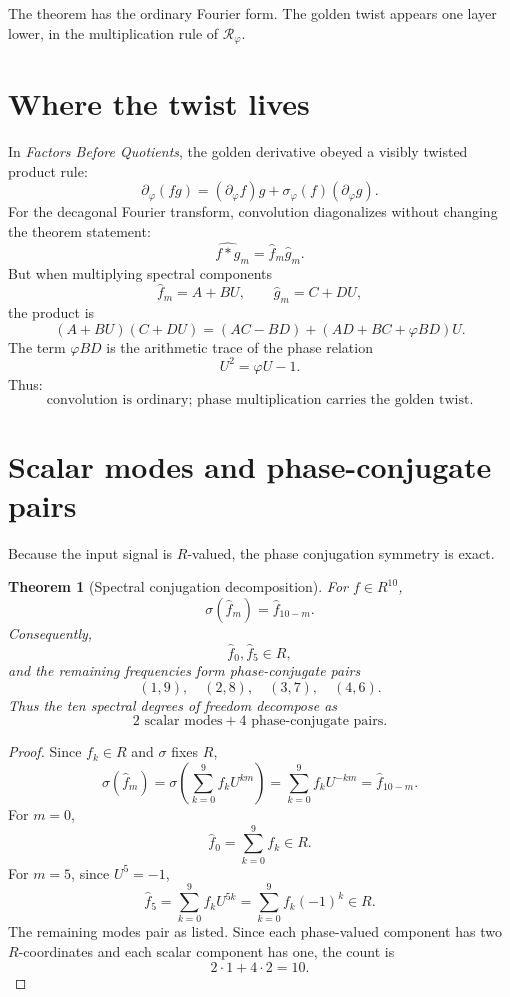 \documentclass[11pt]{article}
\newtheorem{theorem}[definition]{Theorem}
\newcommand{\ph}{\varphi}
\newcommand{\RR}{\mathcal R_\ph}
\newcommand{\sig}{\sigma}
\begin{document}
The theorem has the ordinary Fourier form.  The golden twist appears one layer lower, in the multiplication rule of $\RR$.

\section{Where the twist lives}

In \emph{Factors Before Quotients}, the golden derivative obeyed a visibly twisted product rule:
\[
    \partial_\ph(fg)=(\partial_\ph f)g+\sig_\ph(f)(\partial_\ph g).
\]
For the decagonal Fourier transform, convolution diagonalizes without changing the theorem statement:
\[
    \widehat{f*g}_m=\widehat f_m\widehat g_m.
\]
But when multiplying spectral components
\[
    \widehat f_m=A+BU,
    \qquad
    \widehat g_m=C+DU,
\]
the product is
\[
    (A+BU)(C+DU)=(AC-BD)+(AD+BC+\ph BD)U.
\]
The term $\ph BD$ is the arithmetic trace of the phase relation
\[
    U^2=\ph U-1.
\]
Thus:
\[
    \boxed{\text{convolution is ordinary; phase multiplication carries the golden twist.}}
\]

\section{Scalar modes and phase-conjugate pairs}

Because the input signal is $R$-valued, the phase conjugation symmetry is exact.

\begin{theorem}[Spectral conjugation decomposition]
For $f\in R^{10}$,
\[
    \sig(\widehat f_m)=\widehat f_{10-m}.
\]
Consequently,
\[
    \widehat f_0,\widehat f_5\in R,
\]
and the remaining frequencies form phase-conjugate pairs
\[
    (1,9),\quad(2,8),\quad(3,7),\quad(4,6).
\]
Thus the ten spectral degrees of freedom decompose as
\[
    2\text{ scalar modes}+4\text{ phase-conjugate pairs}.
\]
\end{theorem}

\begin{proof}
Since $f_k\in R$ and $\sig$ fixes $R$,
\[
    \sig(\widehat f_m)
    =\sig\left(\sum_{k=0}^{9}f_kU^{km}\right)
    =\sum_{k=0}^{9}f_kU^{-km}
    =\widehat f_{10-m}.
\]
For $m=0$,
\[
    \widehat f_0=\sum_{k=0}^{9}f_k\in R.
\]
For $m=5$, since $U^5=-1$,
\[
    \widehat f_5=\sum_{k=0}^{9}f_kU^{5k}
    =\sum_{k=0}^{9}f_k(-1)^k\in R.
\]
The remaining modes pair as listed.  Since each phase-valued component has two $R$-coordinates and each scalar component has one, the count is
\[
    2\cdot1+4\cdot2=10.
\]
\end{proof}
\end{document}
